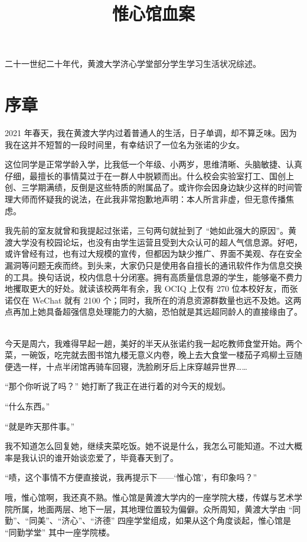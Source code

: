 \documentclass[UTF8]{ctexart}
\title{惟心馆血案}
\begin{document}
\maketitle

二十一世纪二十年代，黄渡大学济心学堂部分学生学习生活状况综述。

\section{序章}

2021 年春天，我在黄渡大学内过着普通人的生活，日子单调，却不算乏味。因为我在这并不短暂的一段时间里，有幸结识了一位名为张诺的少女。

这位同学是正常学龄入学，比我低一个年级、小两岁，思维清晰、头脑敏捷、认真仔细，最擅长的事情莫过于在一群人中脱颖而出。什么校会实验室打工、国创上创、三学期满绩，反倒是这些特质的附属品了。或许你会因身边缺少这样的时间管理大师而怀疑我的说法，在此我非常抱歉地声明：本人所言非虚，但无意传播焦虑。

我先前的室友就曾和我提起过张诺，三句两句就扯到了 “她如此强大的原因”。黄渡大学没有校园论坛，也没有由学生运营且受到大众认可的超人气信息源。好吧，或许曾经有过，也有过大规模的宣传，但都因为缺少推广、界面不美观、存在安全漏洞等问题无疾而终。到头来，大家仍只是使用各自擅长的通讯软件作为信息交换的工具。换句话说，校内信息十分闭塞。拥有高质量信息源的学生，能够毫不费力地攫取更大的好处。就读该校两年有余，我 OCIQ 上仅有 270 位本校好友，而张诺仅在 WeChat 就有 2100 个；同时，我所在的消息资源群数量也远不及她。这两点再加上她具备超强信息处理能力的大脑，恐怕就是其远超同龄人的直接缘由了。

~\\

今天是周六，我难得早起一趟，美好的半天从张诺约我一起吃教师食堂开始。两个菜，一碗饭，吃完就去图书馆九楼无意义内卷，晚上去大食堂一楼茄子鸡柳土豆随便选一样，十点半闭馆再骑车回寝，洗脸刷牙后上床穿越异世界……

“那个你听说了吗？” 她打断了我正在进行着的对今天的规划。

“什么东西。”

“就是昨天那件事。”

我不知道怎么回复她，继续夹菜吃饭。她不说是什么，我怎么可能知道。不过大概率是我认识的谁开始谈恋爱了，毕竟春天到了。

“啧，这个事情不方便直接说，我再提示下——‘惟心馆’，有印象吗？”

哦，惟心馆啊，我还真不熟。惟心馆是黄渡大学内的一座学院大楼，传媒与艺术学院所属，地面两层、地下一层，其地理位置较为偏僻。众所周知，黄渡大学由 “同勤”、“同美”、“济心”、“济德” 四座学堂组成，如果从这个角度谈起，惟心馆是 “同勤学堂” 其中一座学院楼。
\end{document}
